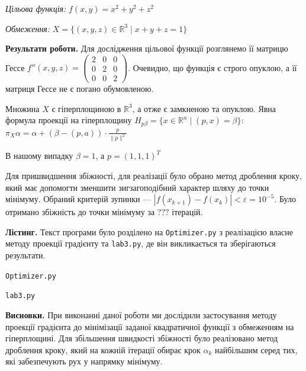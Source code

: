\documentclass{extreport}
\begin{document}
\emph{Цільова функція:}
$f(x,y) = x^2 + y^2 + z^2$

\emph{Обмеження:}
$X = \{ (x,y,z) \in \mathbb{R}^3 \mid x + y + z = 1 \}$

\noindent\textbf{Результати роботи.}
Для дослідження цільової функції розглянемо її матрицю Гессе
$f''(x,y,z) = \begin{pmatrix}
    2 & 0 & 0 \\
    0 & 2 & 0 \\
    0 & 0 & 2
\end{pmatrix}$. Очевидно, що функція є строго опуклою,
а її матриця Гессе не є погано обумовленою.

Множина $X$ є гіперплощиною в $\mathbb{R}^3$, а отже є замкненою та опуклою.
Явна формула проекції на гіперплощину
$H_{p\beta} = \{x \in \mathbb{R}^n \mid (p,x)=\beta\}$:
$\pi_X\alpha = \alpha + (\beta - (p,a))\cdot \frac{p}{\|p\|^2}$

В нашому випадку $\beta = 1$, а $p=(1,1,1)^T$

Для пришвидшення збіжності, для реалізації було обрано метод дроблення кроку,
який має допомогти зменшити зигзагоподібний характер шляху до точки мінімуму.
Обраний критерій зупинки --- $\left| f(x_{k+1}) - f(x_k)\right| < \varepsilon = 10^{-5}$.
Було отримано збіжність до точки мінімуму за $???$ ітерацій.


\noindent\textbf{Лістинг.}
Текст програми було розділено на \texttt{Optimizer.py} з реалізацією
власне методу проекції градієнту та \texttt{lab3.py}, де він викликається та зберігаються результати.

\noindent\texttt{Optimizer.py}


\noindent\texttt{lab3.py}


\noindent\textbf{Висновки.} При виконанні даної роботи ми дослідили
застосування методу проекції градієнта до мінімізації заданої квадратичної функції 
з обмеженням на гіперплощині. Для збільшення швидкості збіжності було реалізовано метод дроблення кроку,
який на кожній ітерації обирає крок $\alpha_k$ найбільшим серед тих, які забезпечують рух
у напрямку мінімуму.
\end{document}

